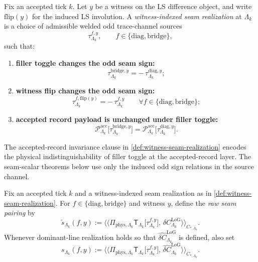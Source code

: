 \documentclass[11pt]{article}
\begin{document}
\begin{definition}
\label{def:witness-seam-realization}
Fix an accepted tick \(k\).
Let \(y\) be a witness on the LS difference object, and write \(\mathrm{flip}(y)\) for the induced
LS involution.
A \emph{witness-indexed seam realization} at \(\Lambda_k\) is a choice of admissible welded odd
trace-channel sources
\[
\tau^{f,y}_{\Lambda_k},
\qquad
f\in\{\mathrm{diag},\mathrm{bridge}\},
\]
such that:
\begin{enumerate}[leftmargin=2em]
\item \textbf{filler toggle changes the odd seam sign:}
  \[
  \tau^{\mathrm{bridge},y}_{\Lambda_k}
  =
  -\,\tau^{\mathrm{diag},y}_{\Lambda_k};
  \]
\item \textbf{witness flip changes the odd seam sign:}
  \[
  \tau^{f,\mathrm{flip}(y)}_{\Lambda_k}
  =
  -\,\tau^{f,y}_{\Lambda_k}
  \qquad
  \forall f\in\{\mathrm{diag},\mathrm{bridge}\};
  \]
\item \textbf{accepted record payload is unchanged under filler toggle:}
  \[
  \mathcal P^{\mathrm{acc}}_{\Lambda_k}\!\big[\tau^{\mathrm{bridge},y}_{\Lambda_k}\big]
  =
  \mathcal P^{\mathrm{acc}}_{\Lambda_k}\!\big[\tau^{\mathrm{diag},y}_{\Lambda_k}\big].
  \]
\end{enumerate}
\end{definition}

\begin{remark}
\label{rem:accepted-record-vs-seam}
The accepted-record invariance clause in \cref{def:witness-seam-realization} encodes the physical
indistinguishability of filler toggle at the accepted-record layer.
The seam-scalar theorems below use only the induced odd sign relations in the source channel.
\end{remark}

\begin{definition}
\label{def:raw-seam-pairing}
Fix an accepted tick \(k\) and a witness-indexed seam realization as in
\cref{def:witness-seam-realization}.
For \(f\in\{\mathrm{diag},\mathrm{bridge}\}\) and witness \(y\), define the \emph{raw seam
pairing} by
\begin{equation}
\widetilde s_{\Lambda_k}(f,y)
:=
\big\langle\!\big\langle
\Pi_{\mathrm{phys},\Lambda_k}\mathsf T_{\Lambda_k}\!\big[\tau^{f,y}_{\Lambda_k}\big],\,
\delta C^{\mathrm{LoG}}_{\Lambda_k}
\big\rangle\!\big\rangle_{C_{\ast,\Lambda_k}}.
\label{eq:raw-seam-pairing}
\end{equation}
Whenever dominant-line realization holds so that
\(
\widehat{\delta C}^{\mathrm{LoG}}_{\Lambda_k}
\)
is defined, also set
\begin{equation}
s_{\Lambda_k}(f,y)
:=
\big\langle\!\big\langle
\Pi_{\mathrm{phys},\Lambda_k}\mathsf T_{\Lambda_k}\!\big[\tau^{f,y}_{\Lambda_k}\big],\,
\widehat{\delta C}^{\mathrm{LoG}}_{\Lambda_k}
\big\rangle\!\big\rangle_{C_{\ast,\Lambda_k}}.
\label{eq:normalized-seam-pairing}
\end{equation}
\end{definition}
\end{document}
